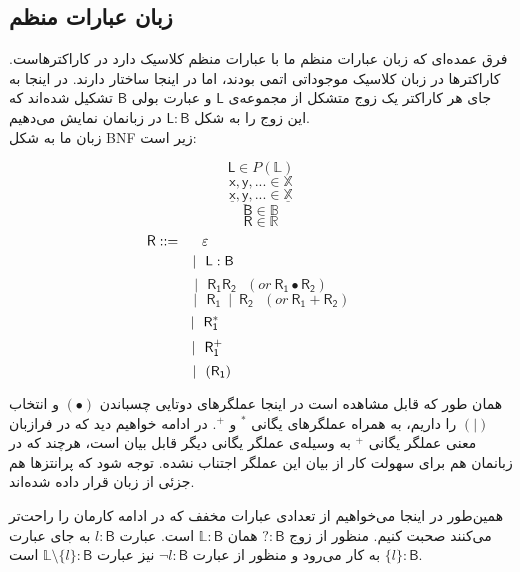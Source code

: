 \subsection{زبان عبارات منظم}
فرق عمده‌ای که زبان عبارات منظم ما با عبارات منظم کلاسیک دارد در کاراکترهاست. کاراکترها در زبان کلاسیک موجوداتی اتمی بودند، اما در اینجا ساختار دارند. در اینجا به جای هر کاراکتر یک زوج متشکل از مجموعه‌ی $\mathsf{L}$ و عبارت بولی $\mathsf{B}$ تشکیل شده‌اند که این زوج را به شکل 
$\mathsf{L : B}$
در زبانمان نمایش می‌دهیم.\\ 
زبان ما به شکل BNF زیر است:
\begin{defn}
$$\mathsf{L} \in \mathit{P}(\mathbb{L})$$        
$$\mathsf{x,y,...} \in \mathbb{X}$$
$$\mathsf{\underline{x},\underline{y},...} \in \mathbb{\underline{X}}$$
$$\mathsf{B} \in \mathbb{B}$$
$$\mathsf{R} \in \mathbb{R}$$
\newpage
$$\mathsf{R} ::=\hspace{0.5cm} \varepsilon\hspace{4.2cm}$$
$$|\:\:\:\mathsf{L : B}\hspace{2.4cm}$$
$$|\:\:\:\mathsf{R_1 R_2}\:\:\:(or\:\mathsf{R_1 \bullet R_2 })$$
$$\:\:\:\:\:\:\:|\:\:\:\mathsf{R_1\:\mid\:R_2}\:\:\:(or\:\mathsf{R_1 + R_2 })$$
$$|\:\:\:\mathsf{R_1^*}\hspace{2.8cm}$$
$$|\:\:\:\mathsf{R_1^+}\hspace{2.7cm}$$
$$|\:\:\:(\mathsf{R_1})\hspace{2.47cm}$$
\end{defn}
همان طور که قابل مشاهده است در اینجا عملگرهای دوتایی چسباندن
$(\bullet)$
 و انتخاب
$(|)$
 را داریم، به همراه عملگرهای یگانی 
$^*$
و
$^+$.
در ادامه خواهیم دید که در فرازبان معنی عملگر یگانی 
$^+$
به وسیله‌ی عملگر یگانی دیگر قابل بیان است، هرچند که در زبانمان هم برای سهولت کار از بیان این عملگر اجتناب نشده. 
توجه شود که پرانتزها هم جزئی از زبان قرار داده شده‌اند.


همین‌طور در اینجا می‌خواهیم از تعدادی عبارات مخفف که در ادامه کارمان را راحت‌تر می‌کنند صحبت کنیم. منظور از زوج 
$\mathsf{? : B}$
همان 
$\mathbb{L}\mathsf{ : B}$
است. عبارت 
$l : \mathsf{B}$
به جای عبارت 
$\{l\} : \mathsf{B}$
به کار می‌رود و منظور از عبارت 
$\neg l \mathsf{: B}$
نیز عبارت 
$\mathbb{L}\setminus\{l\}:\mathsf{B}$
است.

